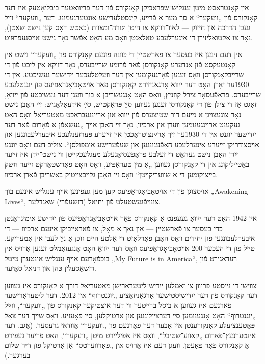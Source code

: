 \documentclass[12pt, draft]{article}
\begin{document}
אין קאָנטראַסט מיטן ענגליש־שפּראַכיקן קאָנקורס פֿון דער פּריװאַטער ביבליאָטעק איז דער קאָנקורס פֿון „װעקער“ אַ סך מער אַ פֿרײַע, קינסטלערישע אונטערנעמונג. דער „װעקער“ װיל געבן הדרכה און חיזוק — לאַװ־דװקא צו היטן תּורה־ומצװת (כאָטש דאָס קען נישט שאַטן), נאָר צו אַקטואַליזירן די אינערלעכע טאַלאַנטן װאָס מע האָט אפֿשר נאָך נישט אױסגעפּרוּװט.

אין דעם זינען איז בעסער צו פֿאַרשטײן די כּװנה פֿונעם קאָנקורס פֿון „װעקער“ נישט אין קאָנטעקסט פֿון אַנדערע קאָנקורסן פֿאַר פֿרומע שרײַבערס, נאָר דװקא אין ליכט פֿון די שרײַבקאָנקורסן װאָס זענען פֿאָרגעקומען אין דער װעלטלעכער ייִדישער געשיכטע. אין די 1930ער יאָרן האָט דער ייִװאָ אָרגאַניזירט קאָנקורסן פֿאַר אױטאָביאָגראַפֿיעס פֿון יוגנטלעכע שרײַבערס. פּראָפֿעסאָר צירל קוזניץ, װאָס האָט אָנגעשריבן אַ בוך װעגן דער געשיכטע פֿון ייִװאָ, זאָגט אַז די צילן פֿון די קאָנקורסן זענען געװען סײַ פּראַקטיש, סײַ אידעאָלאָגיש: זײ האָבן נישט נאָר צוגעצױגן אַ נײַעם דור שטיצערס פֿון ייִװאָ און אַרײַנגעבראַכט מאַטעריאַל װאָס האָט געקענט אַרײַנגענומען װערן אין אַרכיװ, נאָר זײ האָבן אױך „געשאַפֿן אַ פֿאָרום פֿאַר דער ייִדישער יוגנט אין די 1930ער זיך אַרײַנצוטראַכטן אין זײערע פּערזענלעכע איבערלעבונגען און אױסצודריקן זײערע אינערלעכע האָפֿענונגען און שעפֿערישע אימפּולסן“. צוליב דעם װאָס יונגע ייִדן האָבן נישט געהאַט די זעלבע פּראָפֿעסיאָנעלע מעגלעכקײטן װי נישט־ייִדן איז זײער באַטײליקונג אין די קאָנקורסן געװען „אַ מין טעראַפּיע, װאָס האָט פֿאַרשטאַרקט זײער חשק בײַצוקומען די אָ שװעריקײטן“ װאָס זײ האָבן גלײַכצײַטיק באַשריבן פֿאַרן אַרכיװ.

אױסצוגן פֿון די אױטאָביאָגראַפֿיעס קען מען געפֿינען אױף ענגליש אינעם בוך „Awakening Lives“, צונױפֿגעשטעלט פֿון יחיאל (דזשעפֿרי) שאַנדלער.

אין 1942 האָט דער ייִװאָ געעפֿנט אַ קאָנקורס פֿאַר אױטאָביאָגראַפֿיעס פֿון ייִדישע אימיגראַנטן כּדי בעסער צו פֿאַרשטײן — און נאָך אַ מאָל, צו פֿאַראײביקן אינעם אַרכיװ — די איבערלעבונגען פֿון יחידים װאָס האָבן פֿאַרלאָזט די אַלטע הײם זוכן אַ נײַ לעבן אין אַמעריקע. טײל פֿון די העכער 200 אױטאָביאָגראַפֿיעס װאָס דער ייִװאָ האָט אָנגעזאַמלט זענען אַרױס אין בוכפֿאָרעם אױף ענגליש אונטערן טיטל „My Future is in America“, רעדאַגירט פֿון דזשאַסעלין כּהן און דניאל סאָיער.

צװישן די נײַסטע פּרוּװן צו זאַמלען ייִדיש־ליטעראַרישן מאַטעריאַל דורך אַ קאָנקורס איז געװען דער קאָנקורס פֿון דער ייִדישיסטישער אָרגאַניזאַציע „יוגנטרוף“ אין 2012. דער ליטעראַרישער פֿאַרנעם איז געװען אַ ביסל ברײטער װי דער איצטיקער קאָנקורס פֿון „װעקער“, װײַל „יוגנטרוף“ האָט אָנגענומען סײַ דערצײלונגען און אַרטיקלען, סײַ פּאָעזיע. װאָס שײַך דער צאָל פּאָטענציעלע קאָנקורענטן איז אָבער דער פֿאַרנעם פֿון „װעקער“ אַװדאי גרעסער. (אַגבֿ, דער אינטערנעץ־פֿאָרום „קאַװע־שטיבל“, װאָס איז אַפֿיליִיִרט מיטן „װעקער“, האָט פֿריִער געפֿירט אַ קאָנקורס פֿאַר פּאָעטן. װעגן דעם איז אַרױס אין „פֿאָרװערטס“ אַן אַרטיקל פֿון ד״ר שלום בערגער.)
\end{document}
